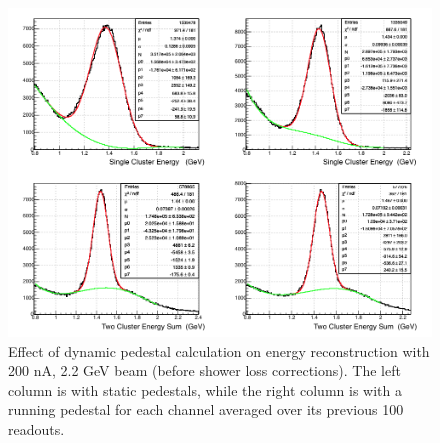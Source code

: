 \documentclass[amsmath,amssymb,notitlepage,12pt]{revtex4-1}
\begin{document}
\begin{figure}[htbp]\centering
    \includegraphics[width=17cm]{pics/running_pedestal_resolution}
    \caption{Effect of dynamic pedestal calculation on energy reconstruction with 200 nA, 2.2 GeV beam (before shower loss corrections).  The left column is with static pedestals, while the right column is with a running pedestal for each channel averaged over its previous 100 readouts.\label{}}
\end{figure}


%
\end{document}

